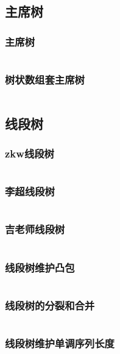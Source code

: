 \documentclass{article}
\begin{document}
\subsection{主席树}
\subsubsection{主席树}
\inputminted[breaklines]{c++}{../数据结构/主席树.cpp}

\subsubsection{树状数组套主席树}
\inputminted[breaklines]{c++}{../数据结构/bit套主席树.cpp}

\subsection{线段树}
\subsubsection{zkw线段树}
\inputminted[breaklines]{c++}{../数据结构/zkw.cpp}

\subsubsection{李超线段树}
\inputminted[breaklines]{c++}{../数据结构/李超线段树.cpp}

\subsubsection{吉老师线段树}
\inputminted[breaklines]{c++}{../数据结构/吉老师线段树.cpp}

\subsubsection{线段树维护凸包}
\inputminted[breaklines]{c++}{../数据结构/线段树维护凸包.cpp}

\subsubsection{线段树的分裂和合并}
\inputminted[breaklines]{c++}{../数据结构/线段树的分裂和合并.cpp}

\subsubsection{线段树维护单调序列长度}
\inputminted[breaklines]{c++}{../数据结构/线段树维护单调序列长度.cpp}
\end{document}

